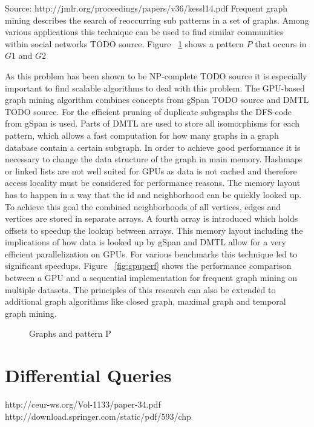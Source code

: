 \documentclass{sig-alternate}
\begin{document}
Source: http://jmlr.org/proceedings/papers/v36/kessl14.pdf
Frequent graph mining describes the search of reoccurring sub patterns 
in a set of graphs. Among various applications this technique can be used to
find similar communities within social networks TODO source.
Figure ~\ref{fig:subgraphs} shows a pattern $P$ that occurs in $G1$ and $G2$

As this problem has been shown to be NP-complete TODO source it is especially important to
find scalable algorithms to deal with this problem.
The GPU-based graph mining algorithm combines concepts from gSpan TODO source
and DMTL TODO source. 
For the efficient pruning of duplicate subgraphs the DFS-code from gSpan is used.
Parts of DMTL are used to store all isomorphisms for each pattern, which allows 
a fast computation for how many graphs in a graph database contain a certain subgraph.
In order to achieve good performance it is necessary 
to change the data structure of the graph in main memory. Hashmaps or linked lists
are not well suited for GPUs as data is not cached and therefore access locality 
must be considered for performance reasons. 
The memory layout has to happen in a way that the id and neighborhood can be quickly looked up.
To achieve this goal the combined neighborhoods of all vertices, edges and vertices are stored 
in separate arrays. A fourth array is introduced which holds offsets to speedup the lookup between arrays.
This memory layout including the implications of how data is looked up by gSpan and DMTL allow
for a very efficient parallelization on GPUs.
For various benchmarks this technique led to significant speedups. Figure ~\ref{fig:gpuperf}
shows the performance comparison between a GPU and a sequential implementation 
for frequent graph mining on multiple datasets.
The principles of this research can also be extended to additional graph algorithms like closed graph,
maximal graph and temporal graph mining.

\begin{figure}
\centering
{}
\caption{Graphs and pattern P}
\label{fig:subgraphs}
\end{figure}

\begin{figure*}
\centering
{}
\caption{GPU Benchmarks}
\label{fig:gpuperf}
\end{figure*}

\section{Differential Queries}
http://ceur-ws.org/Vol-1133/paper-34.pdf
http://download.springer.com/static/pdf/593/chp%
\end{document}
